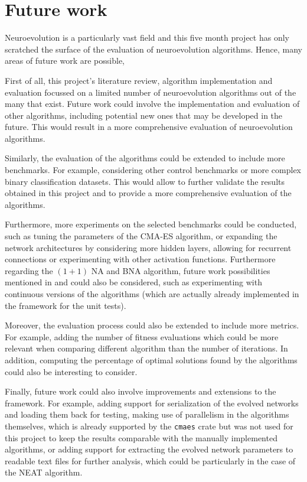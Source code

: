 \chapter{Future work}
\label{chap:future_work}


Neuroevolution is a particularly vast field and this five month project has only scratched the surface of the evaluation of neuroevolution algorithms. Hence, many areas of future work are possible,

First of all, this project's literature review, algorithm implementation and evaluation focussed on a limited number of neuroevolution algorithms out of the many that exist. Future work could involve
the implementation and evaluation of other algorithms, including potential new ones that may be developed in the future. This would result in a more comprehensive evaluation of neuroevolution algorithms.

Similarly, the evaluation of the algorithms could be extended to include more benchmarks. For example, considering other control benchmarks or more complex binary classification datasets.
This would allow to further validate the results obtained in this project and to provide a more comprehensive evaluation of the algorithms.

Furthermore, more experiments on the selected benchmarks could be conducted, such as tuning the parameters of the CMA-ES algorithm, or expanding the network architectures by considering more
hidden layers, allowing for recurrent connections or experimenting with other activation functions. Furthermore regarding the $(1 + 1)$ NA and BNA algorithm, future work possibilities mentioned
in \cite{na} and \cite{bna} could also be considered, such as experimenting with continuous versions of the algorithms (which are actually already implemented in the framework for the unit tests).

Moreover, the evaluation process could also be extended to include more metrics. For example, adding the number of fitness evaluations which could be more relevant when comparing different algorithm
than the number of iterations. In addition, computing the percentage of optimal solutions found by the algorithms could also be interesting to consider.

Finally, future work could also involve improvements and extensions to the framework. For example, adding support for serialization of the evolved networks and loading them back for testing, making
use of parallelism in the algorithms themselves, which is already supported by the \texttt{cmaes} crate but was not used for this project to keep the results comparable with the manually implemented
algorithms, or adding support for extracting the evolved network parameters to readable text files for further analysis, which could be particularly in the case of the NEAT algorithm.

